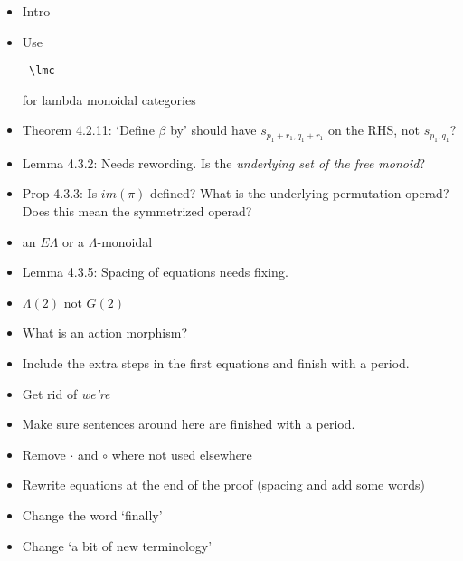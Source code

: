 \documentclass{amsart}
\begin{document}
\begin{itemize}
\item Intro
\item Use \begin{verbatim} \lmc \end{verbatim} for lambda monoidal categories
\item Theorem 4.2.11: `Define $\beta$ by' should have $s_{p_1+r_1,q_1+r_1}$ on the RHS, not $s_{p_1,q_1}$?
\item Lemma 4.3.2: Needs rewording. Is the \textit{underlying set of the free monoid}?
\item Prop 4.3.3: Is $im(\pi)$ defined? What is the underlying permutation operad? Does this mean the symmetrized operad?
\item an $E\Lambda$ or a $\Lambda$-monoidal
\item Lemma 4.3.5: Spacing of equations needs fixing.
\item $\Lambda(2)$ not $G(2)$
\item What is an action morphism?
\item Include the extra steps in the first equations and finish with a period.
\item Get rid of \textit{we're}
\item Make sure sentences around here are finished with a period.
\item Remove $\cdot$ and $\circ$ where not used elsewhere
\item Rewrite equations at the end of the proof (spacing and add some words)
\item Change the word `finally'
\item Change `a bit of new terminology'

\end{itemize}
\end{document}
